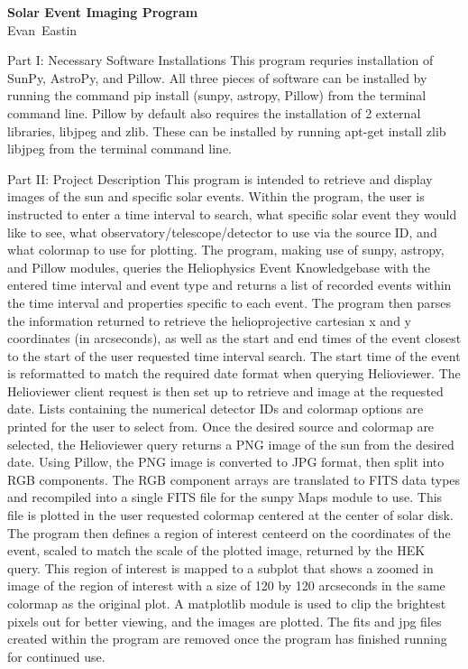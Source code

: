 \documentclass[12pt]{article}
\newcommand\thisis{Solar Event Imaging Program}
\newcommand\theauthor{Evan~Eastin}
\begin{document}
\thispagestyle{firstpg}

\noindent
{\sffamily\bfseries\huge \thisis}\\

\noindent
{\large\sffamily \theauthor}

\vspace*{20bp}

\noindent
Part I: Necessary Software Installations
This program requries installation of SunPy, AstroPy, and Pillow. All three pieces of software can be installed by running the command pip install (sunpy, astropy, Pillow) from the terminal command line. Pillow by default also requires the installation of 2 external libraries, libjpeg and zlib. These can be installed by running apt-get install zlib libjpeg from the terminal command line.

Part II: Project Description
This program is intended to retrieve and display images of the sun and specific solar events. Within the program, the user is instructed to enter a time interval to search, what specific solar event they would like to see, what observatory/telescope/detector to use via the source ID, and what colormap to use for plotting. The program, making use of sunpy, astropy, and Pillow modules, queries the Heliophysics Event Knowledgebase with the entered time interval and event type and returns a list of recorded events within the time interval and properties specific to each event. The program then parses the information returned to retrieve the helioprojective cartesian x and y coordinates (in arcseconds), as well as the start and end times of the event closest to the start of the user requested time interval search. The start time of the event is reformatted to match the required date format when querying Helioviewer. The Helioviewer client request is then set up to retrieve and image at the requested date. Lists containing the numerical detector IDs and colormap options are printed for the user to select from. Once the desired source and colormap are selected, the Helioviewer query returns a PNG image of the sun from the desired date. Using Pillow, the PNG image is converted to JPG format, then split into RGB components. The RGB component arrays are translated to FITS data types and recompiled into a single FITS file for the sunpy Maps module to use. This file is plotted in the user requested colormap centered at the center of solar disk. The program then defines a region of interest centeerd on the coordinates of the event, scaled to match the scale of the plotted image, returned by the HEK query. This region of interest is mapped to a subplot that shows a zoomed in image of the region of interest with a size of 120 by 120 arcseconds in the same colormap as the original plot. A matplotlib module is used to clip the brightest pixels out for better viewing, and the images are plotted. The fits and jpg files created within the program are removed once the program has finished running for continued use.
\end{document}
